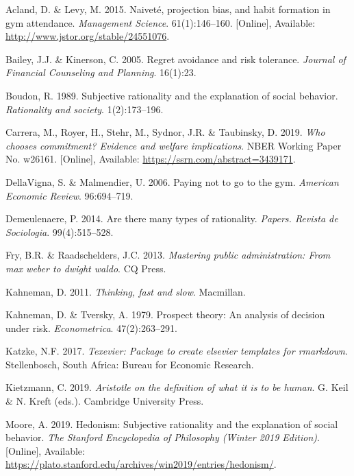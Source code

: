 \documentclass[11pt,preprint, authoryear]{elsarticle}
\numberwithin{equation}{section}
\numberwithin{figure}{section}
\numberwithin{table}{section}
\newlength{\cslhangindent}
\newenvironment{CSLReferences}%
  {\setlength{\parindent}{0pt}%
  \everypar{\setlength{\hangindent}{\cslhangindent}}\ignorespaces}%
  {\par}
\begin{document}
\hypertarget{refs}{}
\begin{CSLReferences}{1}{0}
\leavevmode\hypertarget{ref-gymm}{}%
Acland, D. \& Levy, M. 2015. Naiveté, projection bias, and habit
formation in gym attendance. \emph{Management Science}. 61(1):146--160.
{[}Online{]}, Available: \url{http://www.jstor.org/stable/24551076}.

\leavevmode\hypertarget{ref-regret}{}%
Bailey, J.J. \& Kinerson, C. 2005. Regret avoidance and risk tolerance.
\emph{Journal of Financial Counseling and Planning}. 16(1):23.

\leavevmode\hypertarget{ref-boudon}{}%
Boudon, R. 1989. Subjective rationality and the explanation of social
behavior. \emph{Rationality and society}. 1(2):173--196.

\leavevmode\hypertarget{ref-comm}{}%
Carrera, M., Royer, H., Stehr, M., Sydnor, J.R. \& Taubinsky, D. 2019.
\emph{Who chooses commitment? Evidence and welfare implications}. NBER
Working Paper No. w26161. {[}Online{]}, Available:
\url{https://ssrn.com/abstract=3439171}.

\leavevmode\hypertarget{ref-gym}{}%
DellaVigna, S. \& Malmendier, U. 2006. Paying not to go to the gym.
\emph{American Economic Review}. 96:694--719.

\leavevmode\hypertarget{ref-types}{}%
Demeulenaere, P. 2014. Are there many types of rationality.
\emph{Papers. Revista de Sociologia}. 99(4):515--528.

\leavevmode\hypertarget{ref-fry}{}%
Fry, B.R. \& Raadschelders, J.C. 2013. \emph{Mastering public
administration: From max weber to dwight waldo}. CQ Press.

\leavevmode\hypertarget{ref-fast}{}%
Kahneman, D. 2011. \emph{Thinking, fast and slow}. Macmillan.

\leavevmode\hypertarget{ref-prospect}{}%
Kahneman, D. \& Tversky, A. 1979. Prospect theory: An analysis of
decision under risk. \emph{Econometrica}. 47(2):263--291.

\leavevmode\hypertarget{ref-Texevier}{}%
Katzke, N.F. 2017. \emph{{Texevier}: {P}ackage to create elsevier
templates for rmarkdown}. Stellenbosch, South Africa: Bureau for
Economic Research.

\leavevmode\hypertarget{ref-aristotle}{}%
Kietzmann, C. 2019. \emph{Aristotle on the definition of what it is to
be human}. G. Keil \& N. Kreft (eds.). Cambridge University Press.

\leavevmode\hypertarget{ref-hed}{}%
Moore, A. 2019. Hedonism: Subjective rationality and the explanation of
social behavior. \emph{The Stanford Encyclopedia of Philosophy (Winter
2019 Edition)}. {[}Online{]}, Available:
\url{https://plato.stanford.edu/archives/win2019/entries/hedonism/}.


\end{CSLReferences}
\end{document}
